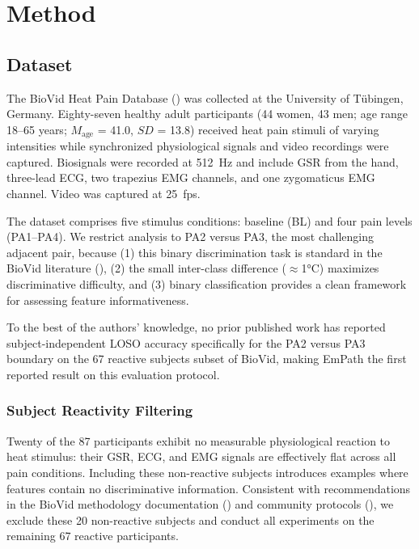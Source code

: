 \documentclass[10pt, twocolumn]{article}
\begin{document}
\section{Method}
\label{sec:method}

\subsection{Dataset}

The BioVid Heat Pain Database (\cite{Walter2013}) was collected at the University of
Tübingen, Germany. Eighty-seven healthy adult participants (44 women, 43 men; age range
18--65 years; $M_{\text{age}}$ = 41.0, $SD$ = 13.8) received heat pain stimuli of varying
intensities while synchronized physiological signals and video recordings were captured.
Biosignals were recorded at 512~Hz and include GSR from the hand, three-lead ECG, two
trapezius EMG channels, and one zygomaticus EMG channel. Video was captured at 25~fps.

The dataset comprises five stimulus conditions: baseline (BL) and four pain levels
(PA1--PA4). We restrict analysis to PA2 versus PA3, the most challenging adjacent
pair, because (1) this binary discrimination task is standard in the BioVid literature
(\cite{Kachele2015}), (2) the small inter-class difference ($\approx$1°C) maximizes
discriminative difficulty, and (3) binary classification provides a clean framework for
assessing feature informativeness.

To the best of the authors' knowledge, no prior published work has reported
subject-independent LOSO accuracy specifically for the PA2 versus PA3 boundary on the 67
reactive subjects subset of BioVid, making EmPath the first reported result on this
evaluation protocol.

\subsubsection{Subject Reactivity Filtering}

Twenty of the 87 participants exhibit no measurable physiological reaction to heat
stimulus: their GSR, ECG, and EMG signals are effectively flat across all pain conditions.
Including these non-reactive subjects introduces examples where features contain no
discriminative information. Consistent with recommendations in the BioVid methodology
documentation (\cite{Walter2013}) and community protocols (\cite{Gruss2015}), we exclude
these 20 non-reactive subjects and conduct all experiments on the remaining 67 reactive
participants.
\end{document}
